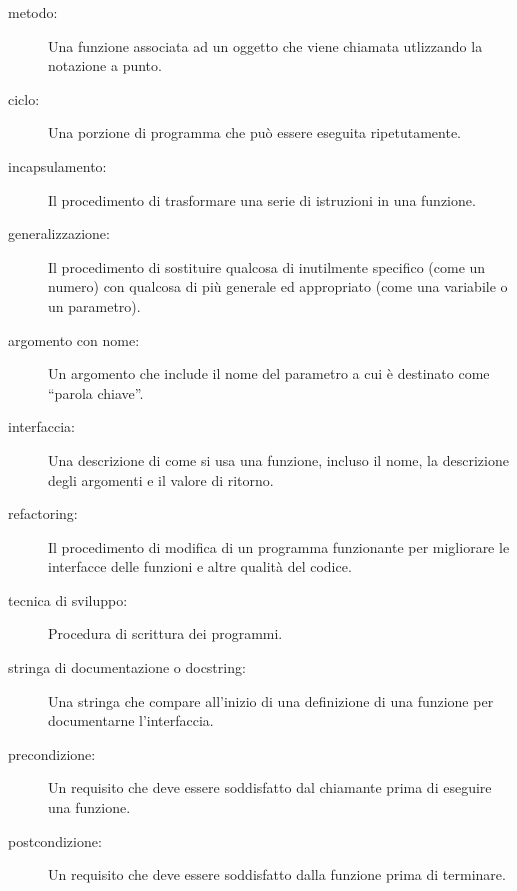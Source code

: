 \documentclass[10pt]{book}
\begin{document}
\begin{description}

\item[metodo:] Una funzione associata ad un oggetto che viene chiamata utlizzando la notazione a punto.

\item[ciclo:] Una porzione di programma che può essere eseguita ripetutamente.

\item[incapsulamento:] Il procedimento di trasformare una serie di istruzioni in una funzione.

\item[generalizzazione:] Il procedimento di sostituire qualcosa di inutilmente specifico (come un numero) con qualcosa di più generale ed appropriato (come una variabile o un parametro).

\item[argomento con nome:] Un argomento che include il nome del parametro a cui è destinato come ``parola chiave''.

\item[interfaccia:] Una descrizione di come si usa una funzione, incluso il nome, la descrizione degli argomenti e il valore di ritorno.

\item[refactoring:] Il procedimento di modifica di un programma funzionante per migliorare le interfacce delle funzioni e altre qualità del codice.

\item[tecnica di sviluppo:] Procedura di scrittura dei programmi.

\item[stringa di documentazione o docstring:]  Una stringa che compare all'inizio di una definizione di una funzione per documentarne l'interfaccia.

\item[precondizione:] Un requisito che deve essere soddisfatto dal chiamante prima di eseguire una funzione.

\item[postcondizione:] Un requisito che deve essere soddisfatto dalla funzione prima di terminare.

\end{description}
\end{document}
